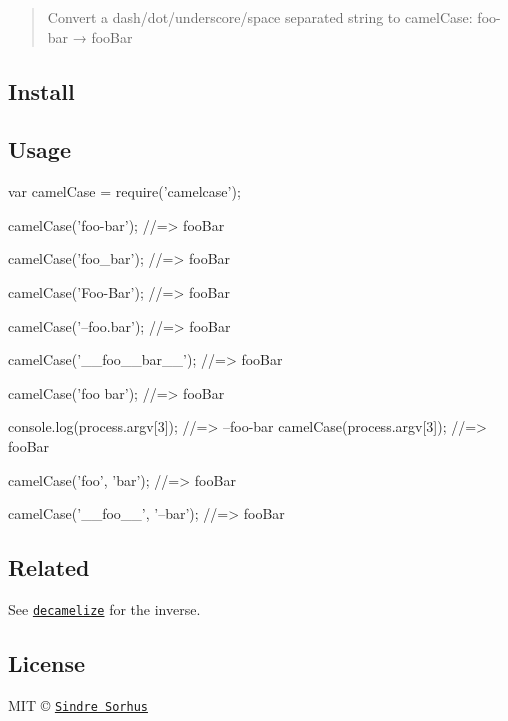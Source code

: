 \begin{quote}
Convert a dash/dot/underscore/space separated string to camel\+Case\+: {\ttfamily foo-\/bar} → {\ttfamily foo\+Bar} \end{quote}


\subsection*{Install}




\subsection*{Usage}


\begin{DoxyCode}
var camelCase = require('camelcase');

camelCase('foo-bar');
//=> fooBar

camelCase('foo\_bar');
//=> fooBar

camelCase('Foo-Bar');
//=> fooBar

camelCase('--foo.bar');
//=> fooBar

camelCase('\_\_foo\_\_bar\_\_');
//=> fooBar

camelCase('foo bar');
//=> fooBar

console.log(process.argv[3]);
//=> --foo-bar
camelCase(process.argv[3]);
//=> fooBar

camelCase('foo', 'bar');
//=> fooBar

camelCase('\_\_foo\_\_', '--bar');
//=> fooBar
\end{DoxyCode}


\subsection*{Related}

See \href{https://github.com/sindresorhus/decamelize}{\tt {\ttfamily decamelize}} for the inverse.

\subsection*{License}

M\+IT © \href{http://sindresorhus.com}{\tt Sindre Sorhus} 